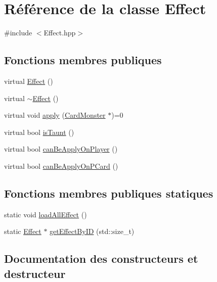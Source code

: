 \hypertarget{classEffect}{}\section{Référence de la classe Effect}
\label{classEffect}


{\ttfamily \#include $<$Effect.\+hpp$>$}

\subsection*{Fonctions membres publiques}
\begin{DoxyCompactItemize}
\item 
virtual \hyperlink{classEffect_ae70bfffd7ffd1538c33a2b4590fec0da}{Effect} ()
\item 
virtual \hyperlink{classEffect_ab0f471df484d3ef351b704fef39a7072}{$\sim$\+Effect} ()
\item 
virtual void \hyperlink{classEffect_af75b9e3f53aba579f37cd2a0e30a0296}{apply} (\hyperlink{classCardMonster}{Card\+Monster} $\ast$)=0
\item 
virtual bool \hyperlink{classEffect_adb7655cc87e0602f6f608103ff388a6f}{is\+Taunt} ()
\item 
virtual bool \hyperlink{classEffect_a23e7eba966b28f051ec12865f53cd092}{can\+Be\+Apply\+On\+Player} ()
\item 
virtual bool \hyperlink{classEffect_a81611bfcbbd800ac40b3c38146fb7277}{can\+Be\+Apply\+On\+P\+Card} ()
\end{DoxyCompactItemize}
\subsection*{Fonctions membres publiques statiques}
\begin{DoxyCompactItemize}
\item 
static void \hyperlink{classEffect_ae185e5fd1219ac1d7ffbcd51d0ace58c}{load\+All\+Effect} ()
\item 
static \hyperlink{classEffect}{Effect} $\ast$ \hyperlink{classEffect_a146cdf511868872b7e1879c07c6eb367}{get\+Effect\+By\+I\+D} (std\+::size\+\_\+t)
\end{DoxyCompactItemize}


\subsection{Documentation des constructeurs et destructeur}
\hypertarget{classEffect_ae70bfffd7ffd1538c33a2b4590fec0da}{}
